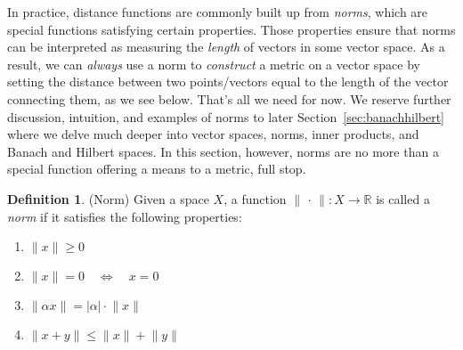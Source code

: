 \documentclass[12pt]{book}
\numberwithin{equation}{section} %
\theoremstyle{plain}
\theoremstyle{definition}
\newtheorem{defn}[thm]{Definition}
\theoremstyle{remark}
\newcommand{\R}{\mathbb{R}}
\begin{document}
In practice, distance functions are commonly built up from \emph{norms},
which are special functions satisfying certain properties. Those
properties ensure that norms can be interpreted as measuring the
\emph{length} of vectors in some vector space.
As a result, we can \emph{always} use a norm to \emph{construct} a
metric on a vector space by setting the distance between two
points/vectors equal to the length of the vector connecting them, as we
see below.
That's all we need for now. We reserve further discussion, intuition,
and examples of norms to later Section~\ref{sec:banachhilbert} where we
delve much deeper into vector spaces, norms, inner products, and Banach
and Hilbert spaces. In this section, however, norms are no more than a
special function offering a means to a metric, full stop.

\begin{defn}(Norm)
\label{defn:norm}
Given a space $X$, a function $\lVert\,\cdot\,\rVert:X\rightarrow \R$ is
called a \emph{norm} if it satisfies the following properties:
\begin{enumerate}
  \item $\lVert x\rVert\geq 0$
  \item $\lVert x\rVert=0 \quad \iff \quad x=0$
  \item $\lVert \alpha x\rVert= |\alpha| \cdot \lVert x\rVert$
  \item $\lVert x+y\rVert \leq \lVert x\rVert + \lVert y\rVert$
\end{enumerate}
\end{defn}
\end{document}
